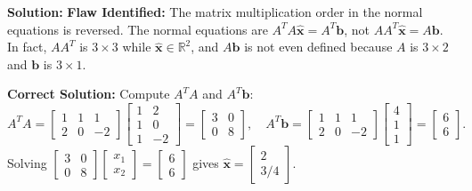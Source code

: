 \documentclass[11pt, letterpaper]{article}
\theoremstyle{definition}
\theoremstyle{remark}
\begin{document}
\textbf{Solution:}
\textbf{Flaw Identified:} The matrix multiplication order in the normal equations is reversed. The normal equations are $A^T A \hat{\mathbf{x}} = A^T \mathbf{b}$, not $AA^T \hat{\mathbf{x}} = A\mathbf{b}$. In fact, $AA^T$ is $3 \times 3$ while $\hat{\mathbf{x}} \in \mathbb{R}^2$, and $A\mathbf{b}$ is not even defined because $A$ is $3 \times 2$ and $\mathbf{b}$ is $3 \times 1$.

\textbf{Correct Solution:} Compute $A^T A$ and $A^T \mathbf{b}$:
\[
A^T A = \begin{bmatrix} 1 & 1 & 1 \\ 2 & 0 & -2 \end{bmatrix} \begin{bmatrix} 1 & 2 \\ 1 & 0 \\ 1 & -2 \end{bmatrix} = \begin{bmatrix} 3 & 0 \\ 0 & 8 \end{bmatrix}, \quad A^T \mathbf{b} = \begin{bmatrix} 1 & 1 & 1 \\ 2 & 0 & -2 \end{bmatrix} \begin{bmatrix} 4 \\ 1 \\ 1 \end{bmatrix} = \begin{bmatrix} 6 \\ 6 \end{bmatrix}.
\]
Solving $\begin{bmatrix} 3 & 0 \\ 0 & 8 \end{bmatrix} \begin{bmatrix} x_1 \\ x_2 \end{bmatrix} = \begin{bmatrix} 6 \\ 6 \end{bmatrix}$ gives $\hat{\mathbf{x}} = \begin{bmatrix} 2 \\ 3/4 \end{bmatrix}$.
\end{document}
